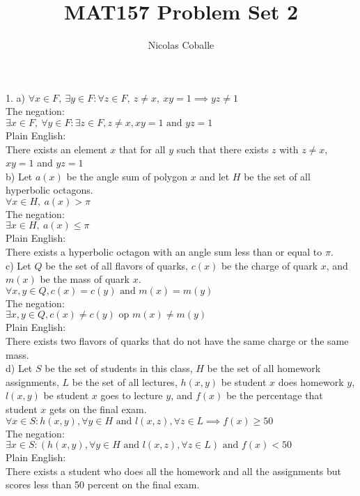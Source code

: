 \documentclass[11pt]{article}
\title{MAT157 Problem Set 2}
\author{Nicolas Coballe}
\begin{document}
\maketitle
\begin{flushleft}

1. a) $\forall x \in F, \ \exists y \in F : \forall z \in F, \ z \neq x, \ xy = 1 \implies yz \neq 1$ \\
The negation: \\
$\exists x \in F, \ \forall y \in F: \exists z \in F, z \neq x, xy = 1 \text{ and } yz = 1$ \\
Plain English: \\
There exists an element $x$ that for all $y$ such that there exists $z$ with $z \neq x$, $xy = 1$ and $yz = 1$ \\
\bigskip
b) Let $a(x)$ be the angle sum of polygon $x$ and let $H$ be the set of all hyperbolic octagons. \\
$\forall x \in H, \ a(x) > \pi$ \\
The negation:  \\
$\exists x \in H, \ a(x) \leq \pi$ \\
Plain English: \\
There exists a hyperbolic octagon with an angle sum less than or equal to $\pi$. \\
\bigskip
c) Let $Q$ be the set of all flavors of quarks, $c(x)$ be the charge of quark $x$, and $m(x)$ be the mass of quark $x$. \\
$\forall x,y \in Q, c(x) = c(y) \text{ and } m(x) = m(y)$ \\
The negation: \\
$\exists x,y \in Q, c(x) \neq c(y) \text{ op } m(x) \neq m(y)$ \\
Plain English: \\
There exists two flavors of quarks that do not have the same charge or the same mass. \\
\bigskip
d) Let $S$ be the set of students in this class, $H$ be the set of all homework assignments, $L$ be the set of all lectures, $h(x,y)$ be student $x$ does homework $y$, $l(x,y)$ be student $x$ goes to lecture $y$, and $f(x)$ be the percentage that student $x$ gets on the final exam. \\
$\forall x \in S: h(x,y), \forall y \in H \text{ and } l(x,z), \forall z \in L \implies f(x) \geq 50$ \\
The negation: \\
$\exists x \in S: (h(x,y), \forall y \in H \text{ and } l(x,z), \forall z \in L) \text{ and } f(x) < 50$ \\
Plain English: \\
There exists a student who does all the homework and all the assignments but scores less than 50 percent on the final exam. \\


\end{flushleft}
\end{document}
